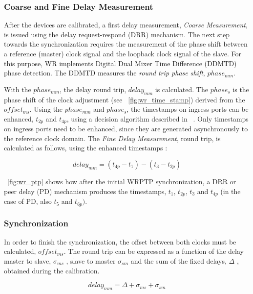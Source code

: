 \subsubsection{Coarse and Fine Delay Measurement}
\label{sec:delay_ms}
After the devices are calibrated, a first delay measurement, \textit{Coarse
Measurement}, is issued using the delay request-respond (DRR) mechanism. 
The next step towards the synchronization requires the measurement of the phase shift
between a reference (master) clock signal and the loopback clock signal
of the slave. For this purpose, WR implements Digital Dual Mixer Time Difference
(DDMTD) ~\cite{biblio:ddmtd} phase detection. The DDMTD measures the \textit{round trip phase
shift}, $phase_{mm}$.

With the $phase_{mm}$, the delay round trip, $delay_{mm}$ is calculated. The $phase_{s}$
is the phase shift of the clock adjustment (see \figurename~\ref{fig:wr_time_stamp})  
derived from the $offset_{ms}$. Using the $phase_{mm}$ and $phase_{s}$, 
the timestamps on ingress ports can be enhanced,
$t_{2p}$ and  $t_{4p}$, using a decision algorithm described in ~\cite{biblio:tomas}.
Only timestamps on ingress ports need to be enhanced, since they are generated 
asynchronously to the reference clock domain. The \textit{Fine Delay Measurement}, round trip,
is calculated as follows, using the enhanced timestamps :

\begin{equation}
  \label{eq:round_trip}
    delay_{mm} = (t_{4p} - t_1) - (t_3 - t_{2p})
\end{equation}

\figurename~\ref{fig:wr_ptp} shows how after the initial WRPTP synchronization, 
a DRR or peer delay (PD) mechanism produces the timestamps, $t_{1}$, $t_{2p}$,
$t_{3}$ and $t_{4p}$ (in the case of PD, also
$t_{5}$ and $t_{6p})$.

\subsubsection{Synchronization}
In order to finish the synchronization, the offset between both clocks must be
calculated, $offset_{ms}$. 
The round trip can be expressed as a function of the  delay master to slave, $\sigma _{ms}$ , slave to
master $\sigma _{sm}$ and the sum of the fixed delays, $\Delta$ , obtained during the calibration.

\begin{equation}
  \label{eq:round_trip_2}
    delay_{mm} = \Delta + \sigma _{ms} + \sigma _{sm}
\end{equation}

